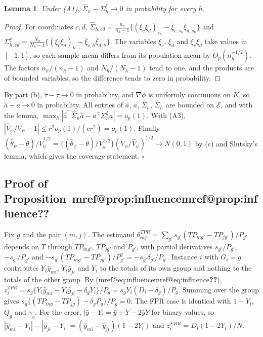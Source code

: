 \documentclass[pdflatex,sn-mathphys-num,iicol]{sn-jnl}
\makeatletter
\theoremstyle{thmstyleone}
\newtheorem{lemma}[proposition]{Lemma}
\theoremstyle{thmstyletwo}
\theoremstyle{thmstylethree}
\newcommand{\Mref}[1]{\ifcsname mref@#1\endcsname\csname mref@#1\endcsname\else\textbf{??}\fi}
\makeatother
\begin{document}
\begin{lemma}\label{prop:lemma-cov}
Under (A1), $\hat\Sigma_h-\Sigma^\xi_h\to0$ in probability for every $h$.
\end{lemma}
\begin{proof}
For coordinates $c,d$,
$\hat\Sigma_{h,cd}=\frac{n_h}{n_h-1}\{\overline{(\xi_c\xi_d)}_{s_h}-\bar\xi_{c,s_h}\bar\xi_{d,s_h}\}$ and
$\Sigma^\xi_{h,cd}=\frac{N_h}{N_h-1}\{\overline{(\xi_c\xi_d)}_{h}-\bar\xi_{c,h}\bar\xi_{d,h}\}$. The variables
$\xi_c$, $\xi_d$ and $\xi_c\xi_d$ take values in $[-1,1]$, so each sample mean differs from its population
mean by $O_p(n_h^{-1/2})$. The factors $n_h/(n_h-1)$ and $N_h/(N_h-1)$ tend to one, and the products
are of bounded variables, so the difference tends to zero in probability.
\end{proof}

By part (b), $\hat\tau-\tau\to0$ in probability, and $\nabla\phi$ is uniformly continuous on $K$, so
$\hat a-a\to0$ in probability. All entries of $\hat a$, $a$, $\hat\Sigma_h$, $\Sigma_h$ are bounded
on $\mathcal E$, and with the lemma, $\max_h|\hat a^\top\hat\Sigma_h\hat a-a^\top\Sigma^\xi_ha|=o_p(1)$.
With (A3), $|\hat V_\psi/V_\psi-1|\le r^2o_p(1)/(cr^2)=o_p(1)$. Finally
$(\hat\theta_\psi-\theta)/\hat V_\psi^{1/2}=\{(\hat\theta_\psi-\theta)/V_\psi^{1/2}\}(V_\psi/\hat V_\psi)^{1/2}\to N(0,1)$ by (c)
and Slutsky's lemma, which gives the coverage statement. $\square$

\subsection{Proof of Proposition~\Mref{prop:influence}}

Fix $g$ and the pair $(m,j)$. The estimand $\theta^{TPR}_{mj}=\sum_{g'}s_{g'}(TP_{mg'}-TP_{jg'})/P_{g'}$
depends on $T$ through $TP_{mg'}$, $TP_{jg'}$ and $P_{g'}$, with partial derivatives
$s_{g'}/P_{g'}$, $-s_{g'}/P_{g'}$ and $-s_{g'}(TP_{mg'}-TP_{jg'})/P_{g'}^2=-s_{g'}\delta_{g'}/P_{g'}$.
Instance $i$ with $G_i=g$ contributes $Y_i\hat y_{mi}$, $Y_i\hat y_{ji}$ and $Y_i$ to the totals
of its own group and nothing to the totals of the other group. By (\Mref{eq:influence}),
$z^{TPR}_i=s_g\{Y_i\hat y_{mi}-Y_i\hat y_{ji}-\delta_gY_i\}/P_g=s_gY_i(D_i-\delta_g)/P_g$. Summing
over the group gives $s_g\{(TP_{mg}-TP_{jg})-\delta_gP_g\}/P_g=0$. The FPR case is identical with
$1-Y_i$, $Q_g$ and $\gamma_g$. For the error, $|\hat y-Y|=\hat y+Y-2\hat yY$ for binary values,
so $|\hat y_{mi}-Y_i|-|\hat y_{ji}-Y_i|=(\hat y_{mi}-\hat y_{ji})(1-2Y_i)$ and
$z^{ERR}_i=D_i(1-2Y_i)/N$.
\end{document}
